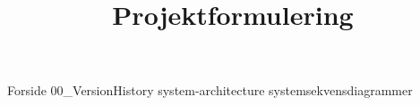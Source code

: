 \documentclass[a4paper,openany]{memoir}
\title{Projektformulering}
\begin{document}
	{Forside}  \newpage
	\tableofcontents\thispagestyle{fancy}
	{00_VersionHistory}  \newpage
	{system-architecture}  \newpage
	{systemsekvensdiagrammer}  \newpage
	
	
	 {}
	\printbibliography
\end{document}

